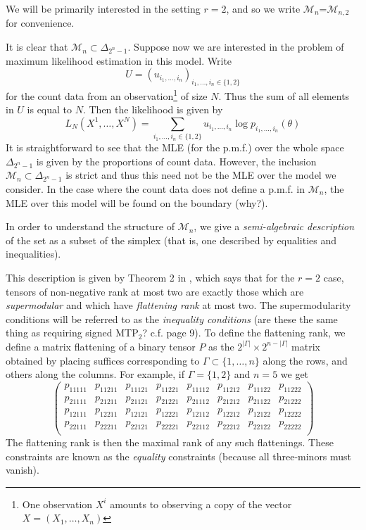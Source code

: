 \documentclass{article}
\theoremstyle{plain}
\theoremstyle{definition}
\theoremstyle{plain} %
\newcommand{\M}{{\mathcal M}}
\begin{document}
\vspace{1ex}
We will be primarily interested in the setting $r=2$, and so we write $\mathcal{M}_n$=$\M_{n,2}$ for convenience.

\vspace{2ex}
It is clear that $\mathcal{M}_n\subset\Delta_{2^n-1}$. Suppose now we are interested in the problem of maximum likelihood estimation in this model. Write $$U=(u_{i_1,\dots,i_n})_{i_1,\dots,i_n\in\{1,2\}}$$ for the count data from an observation\footnote{One observation $X^{i}$ amounts to observing a copy of the vector $X=(X_1,\dots,X_n)$} of size $N$. Thus the sum of all elements in $U$ is equal to $N$. Then the likelihood is given by
$$L_N(X^1,\dots,X^N)=\sum_{i_1,\dots,i_n\in\{1,2\}}u_{i_1,\dots,i_n}\log p_{i_1,\dots,i_n}(\theta)$$
It is straightforward to see that the MLE (for the p.m.f.) over the whole space $\Delta_{2^n-1}$ is given by the proportions of count data. However, the inclusion $\mathcal{M}_n\subset\Delta_{2^n-1}$ is strict and thus this need not be the MLE over the model we consider. In the case where the count data does not define a p.m.f. in $\M_n$, the MLE over this model will be found on the boundary (why?).

\vspace{2ex}
In order to understand the structure of $\mathcal{M}_n$, we give a \textit{semi-algebraic description} of the set as a subset of the simplex (that is, one described by equalities and inequalities).

\vspace{2ex}
This description is given by Theorem 2 in \cite{allman2017maximum}, which says that for the $r=2$ case, tensors of non-negative rank at most two are exactly those which are \textit{supermodular} and which have \textit{flattening rank} at most two. The supermodularity conditions will be referred to as the \textit{inequality conditions} (are these the same thing as requiring signed MTP$_2$? c.f. \cite{lauritzen2019total} page 9). To define the flattening rank, we define a matrix flattening of a binary tensor $P$ as the $2^{\lvert\Gamma\rvert}\times2^{n-\lvert\Gamma\rvert}$ matrix obtained by placing suffices corresponding to $\Gamma\subset\{1,\dots,n\}$ along the rows, and others along the columns. For example, if $\Gamma=\{1,2\}$ and $n=5$ we get
$$\begin{pmatrix} 
p_{11111} & p_{11211} & p_{11121} & p_{11221} & p_{11112} & p_{11212} & p_{11122} & p_{11222}\\
p_{21111} & p_{21211} & p_{21121} & p_{21221} & p_{21112} & p_{21212} & p_{21122} & p_{21222}\\
p_{12111} & p_{12211} & p_{12121} & p_{12221} & p_{12112} & p_{12212} & p_{12122} & p_{12222}\\
p_{22111} & p_{22211} & p_{22121} & p_{22221} & p_{22112} & p_{22212} & p_{22122} & p_{22222}\\
\end{pmatrix}$$
The flattening rank is then the maximal rank of any such flattenings. These constraints are known as the \textit{equality} constraints (because all three-minors must vanish).
\end{document}
